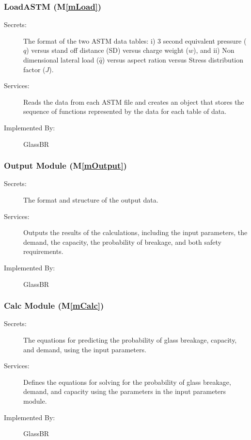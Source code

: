 \documentclass[12pt]{article}
\newcommand{\mref}[1]{M\ref{#1}}
\newcommand{\progname}{GlassBR}
\begin{document}
\subsubsection{LoadASTM (\mref{mLoad})}

\begin{description}
\item[Secrets:] The format of the two ASTM data tables: i) 3 second equivalent
  pressure ($q$) versus stand off distance (SD) versus charge weight ($w$), and
  ii) Non dimensional lateral load ($\hat q$) versus aspect ration versus Stress
  distribution factor ($J$).
\item[Services:] Reads the data from each ASTM file and creates an object that
  stores the sequence of functions represented by the data for each table of
  data.
\item[Implemented By:] \progname{}
\end{description}

\subsubsection{Output Module (\mref{mOutput})}

\begin{description}
\item[Secrets:] The format and structure of the output data.
\item[Services:] Outputs the results of the calculations, including the input
  parameters, the demand, the capacity, the probability of breakage, and both 
  safety requirements.
\item[Implemented By:] \progname{}
\end{description} 

\subsubsection{Calc Module (\mref{mCalc})}

\begin{description}
\item[Secrets:] The equations for predicting the probability of glass 
breakage, capacity, and demand, using the input parameters.
\item[Services:] Defines the equations for solving for the probability of glass 
breakage, demand, and capacity using the parameters in the input parameters 
module.
\item[Implemented By:] \progname{}
\end{description} 
 
\end{document}
